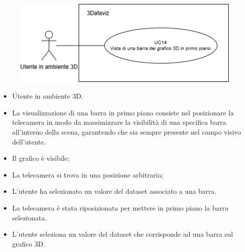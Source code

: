 \begin{figure}[h!]\centering
    \includegraphics[scale=0.7]{template/images/UC14.png}
    \caption{}
\end{figure}
\UCdsc
{ %
    \begin{itemize}
        \item Utente in ambiente 3D.
    \end{itemize}
}
{ %
    \begin{itemize}
        \item La visualizzazione di una barra in primo piano consiste nel posizionare la telecamera in modo da massimizzare la visibilità di una specifica barra all'interno della scena, garantendo che sia sempre presente nel campo visivo dell'utente.
    \end{itemize}
}
{ %
    \begin{itemize}
        \item Il grafico è visibile;
        \item La telecamera si trova in una posizione arbitraria;
        \item L'utente ha selezionato un valore del dataset associato a una barra.
    \end{itemize}
}
{ %
    \begin{itemize}
        \item La telecamera è stata riposizionata per mettere in primo piano la barra selezionata.
    \end{itemize}
}
{ %
    \begin{itemize}
        \item L'utente seleziona un valore del dataset che corrisponde ad una barra sul grafico 3D.
    \end{itemize}
}


